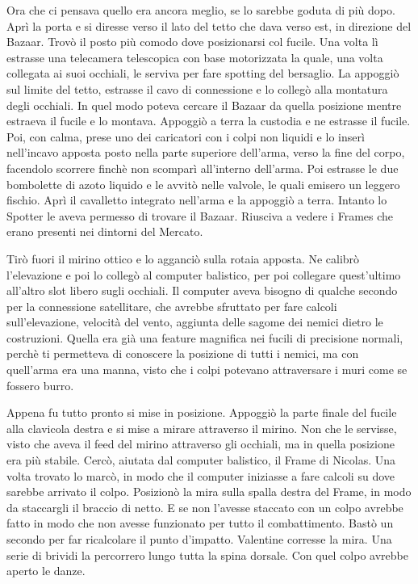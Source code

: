     Ora che ci pensava quello era ancora meglio, se lo sarebbe goduta di più dopo. Aprì la porta e si diresse verso il
    lato del tetto che dava verso est, in direzione del Bazaar. Trovò il posto più comodo dove posizionarsi col fucile.
    Una volta lì estrasse una telecamera telescopica con base motorizzata la quale, una volta collegata ai suoi
    occhiali, le serviva per fare spotting del bersaglio. La appoggiò sul limite del tetto, estrasse il cavo di
    connessione e lo collegò alla montatura degli occhiali. In quel modo poteva cercare il Bazaar da quella posizione
    mentre estraeva il fucile e lo montava. Appoggiò a terra la custodia e ne estrasse il fucile. Poi, con calma, prese
    uno dei caricatori con i colpi non liquidi e lo inserì nell'incavo apposta posto nella parte superiore dell'arma,
    verso la fine del corpo, facendolo scorrere finchè non scomparì all'interno dell'arma. Poi estrasse le due
    bombolette di azoto liquido e le avvitò nelle valvole, le quali emisero un leggero fischio. Aprì il cavalletto
    integrato nell'arma e la appoggiò a terra. Intanto lo Spotter le aveva permesso di trovare il Bazaar. Riusciva a
    vedere i Frames che erano presenti nei dintorni del Mercato.

    Tirò fuori il mirino ottico e lo agganciò sulla rotaia apposta. Ne calibrò l'elevazione e poi lo collegò al computer
    balistico, per poi collegare quest'ultimo all'altro slot libero sugli occhiali. Il computer aveva bisogno di qualche
    secondo per la connessione satellitare, che avrebbe sfruttato per fare calcoli sull'elevazione, velocità del vento,
    aggiunta delle sagome dei nemici dietro le costruzioni. Quella era già una feature magnifica nei fucili di
    precisione normali, perchè ti permetteva di conoscere la posizione di tutti i nemici, ma con quell'arma era una
    manna, visto che i colpi potevano attraversare i muri come se fossero burro.
    
    Appena fu tutto pronto si mise in posizione. Appoggiò la parte finale del fucile alla clavicola destra e si mise a
    mirare attraverso il mirino. Non che le servisse, visto che aveva il feed del mirino attraverso gli occhiali, ma in
    quella posizione era più stabile. Cercò, aiutata dal computer balistico, il Frame di Nicolas. Una volta trovato lo
    marcò, in modo che il computer iniziasse a fare calcoli su dove sarebbe arrivato il colpo. Posizionò la mira sulla
    spalla destra del Frame, in modo da staccargli il braccio di netto. E se non l'avesse staccato con un colpo avrebbe
    fatto in modo che non avesse funzionato per tutto il combattimento. Bastò un secondo per far ricalcolare il punto
    d'impatto. Valentine corresse la mira. Una serie di brividi la percorrero lungo tutta la spina dorsale. Con quel
    colpo avrebbe aperto le danze.

